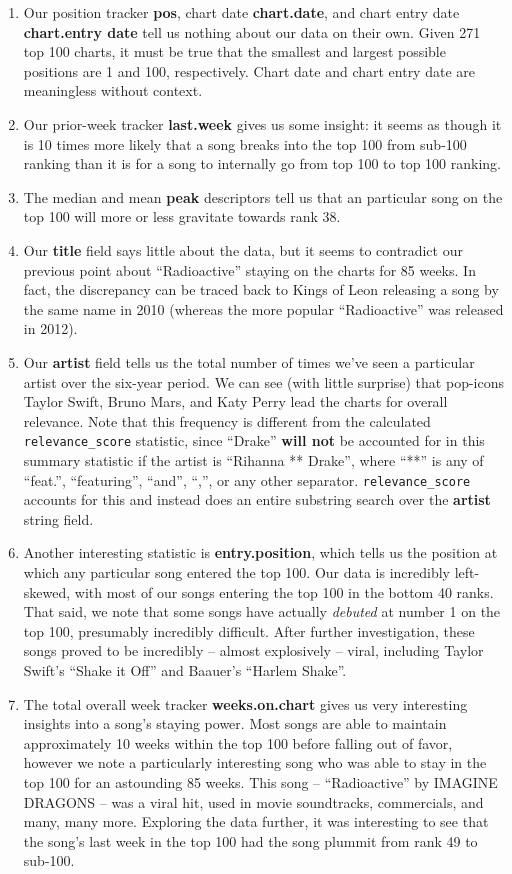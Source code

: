 \documentclass[11pt]{article} %
\begin{document}
\begin{enumerate}
	\item Our position tracker \textbf{pos}, chart date \textbf{chart.date}, and chart entry date \textbf{chart.entry date} tell us nothing about our data on their own. Given 271 top 100 charts, it must be true that the smallest and largest possible positions are 1 and 100, respectively. Chart date and chart entry date are meaningless without context.
	\item Our prior-week tracker \textbf{last.week} gives us some insight: it seems as though it is 10 times more likely that a song breaks into the top 100 from sub-100 ranking than it is for a song to internally go from top 100 to top 100 ranking.
	\item The median and mean \textbf{peak} descriptors tell us that an particular song on the top 100 will more or less gravitate towards rank 38.
	\item Our \textbf{title} field says little about the data, but it seems to contradict our previous point about ``Radioactive'' staying on the charts for 85 weeks. In fact, the discrepancy can be traced back to Kings of Leon releasing a song by the same name in 2010 (whereas the more popular ``Radioactive'' was released in 2012).
	\item Our \textbf{artist} field tells us the total number of times we've seen a particular artist over the six-year period. We can see (with little surprise) that pop-icons Taylor Swift, Bruno Mars, and Katy Perry lead the charts for overall relevance. Note that this frequency is different from the calculated \texttt{relevance\_score} statistic, since ``Drake'' \textbf{will not} be accounted for in this summary statistic if the artist is ``Rihanna ** Drake'', where ``**'' is any of ``feat.'', ``featuring'', ``and'', ``,'', or any other separator. \texttt{relevance\_score} accounts for this and instead does an entire substring search over the \textbf{artist} string field.
	\item Another interesting statistic is \textbf{entry.position}, which tells us the position at which any particular song entered the top 100. Our data is incredibly left-skewed, with most of our songs entering the top 100 in the bottom 40 ranks. That said, we note that some songs have actually \textit{debuted} at number 1 on the top 100, presumably incredibly difficult. After further investigation, these songs proved to be incredibly -- almost explosively -- viral, including Taylor Swift's ``Shake it Off'' and Baauer's ``Harlem Shake''.
	\item The total overall week tracker \textbf{weeks.on.chart} gives us very interesting insights into a song's staying power. Most songs are able to maintain approximately 10 weeks within the top 100 before falling out of favor, however we note a particularly interesting song who was able to stay in the top 100 for an astounding 85 weeks. This song -- ``Radioactive'' by IMAGINE DRAGONS -- was a viral hit, used in movie soundtracks, commercials, and many, many more. Exploring the data further, it was interesting to see that the song's last week in the top 100 had the song plummit from rank 49 to sub-100.
\end{enumerate}
\end{document}
